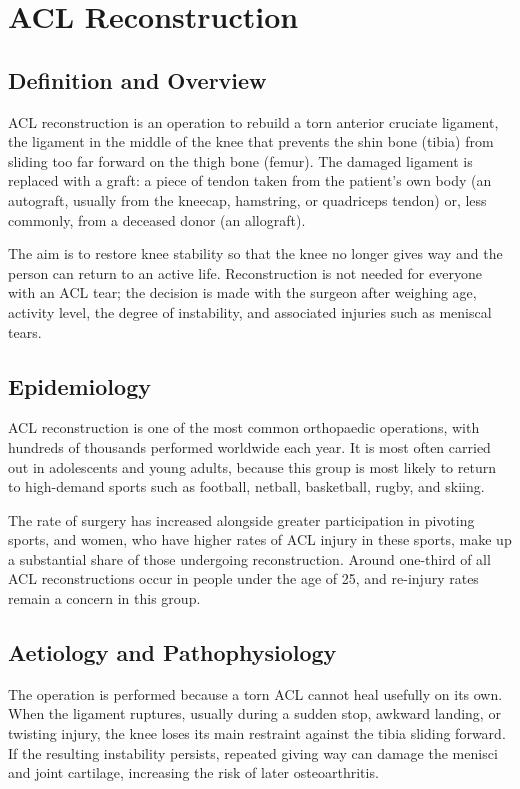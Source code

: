 \chapter{ACL Reconstruction}

\section*{Definition and Overview}
ACL reconstruction is an operation to rebuild a torn anterior cruciate ligament, the ligament in the middle of the knee that prevents the shin bone (tibia) from sliding too far forward on the thigh bone (femur). The damaged ligament is replaced with a graft: a piece of tendon taken from the patient's own body (an autograft, usually from the kneecap, hamstring, or quadriceps tendon) or, less commonly, from a deceased donor (an allograft).

The aim is to restore knee stability so that the knee no longer gives way and the person can return to an active life. Reconstruction is not needed for everyone with an ACL tear; the decision is made with the surgeon after weighing age, activity level, the degree of instability, and associated injuries such as meniscal tears.

\section*{Epidemiology}
ACL reconstruction is one of the most common orthopaedic operations, with hundreds of thousands performed worldwide each year. It is most often carried out in adolescents and young adults, because this group is most likely to return to high-demand sports such as football, netball, basketball, rugby, and skiing.

The rate of surgery has increased alongside greater participation in pivoting sports, and women, who have higher rates of ACL injury in these sports, make up a substantial share of those undergoing reconstruction. Around one-third of all ACL reconstructions occur in people under the age of 25, and re-injury rates remain a concern in this group.

\section*{Aetiology and Pathophysiology}
The operation is performed because a torn ACL cannot heal usefully on its own. When the ligament ruptures, usually during a sudden stop, awkward landing, or twisting injury, the knee loses its main restraint against the tibia sliding forward. If the resulting instability persists, repeated giving way can damage the menisci and joint cartilage, increasing the risk of later osteoarthritis.


